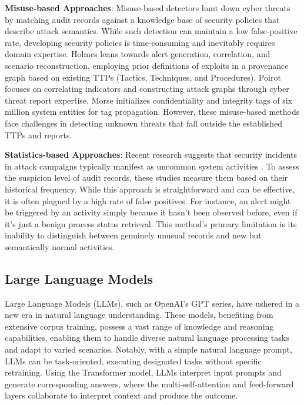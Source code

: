 \textbf{Misuse-based Approaches}:
Misuse-based detectors hunt down cyber threats by matching audit records against a knowledge base of security policies that describe attack semantics.
While such detection can maintain a low false-positive rate, developing security policies is time-consuming and inevitably requires domain expertise.
Holmes \cite{milajerdi2019holmes} leans towards alert generation, correlation, and scenario reconstruction, employing prior definitions of exploits in a provenance graph based on existing TTPs (Tactics, Techniques, and Procedures).
Poirot \cite{milajerdi2019poirot} focuses on correlating indicators and constructing attack graphs through cyber threat report expertise. 
Morse \cite{hossain2020combating} initializes conﬁdentiality and integrity tags of six million system entities for tag propagation.
However, these misuse-based methods face challenges in detecting unknown threats that fall outside the established TTPs and reports.


\textbf{Statistics-based Approaches}:
Recent research suggests that security incidents in attack campaigns typically manifest as uncommon system activities \cite{liu2018towards,hassan2019nodoze,hassan2020we}. To assess the suspicion level of audit records, these studies measure them based on their historical frequency. While this approach is straightforward and can be effective, it is often plagued by a high rate of false positives. For instance, an alert might be triggered by an activity simply because it hasn't been observed before, even if it's just a benign process status retrieval. This method's primary limitation is its inability to distinguish between genuinely unusual records and new but semantically normal activities.





\subsection{Large Language Models}
Large Language Models (LLMs), such as OpenAI's GPT series, have ushered in a new era in natural language understanding. These models, benefiting from extensive corpus training, possess a vast range of knowledge and reasoning capabilities, enabling them to handle diverse natural language processing tasks and adapt to varied scenarios. Notably, with a simple natural language prompt, LLMs can be task-oriented, executing designated tasks without specific retraining. Using the Transformer model, LLMs interpret input prompts and generate corresponding answers, where the multi-self-attention and feed-forward layers collaborate to interpret context and produce the outcome.

